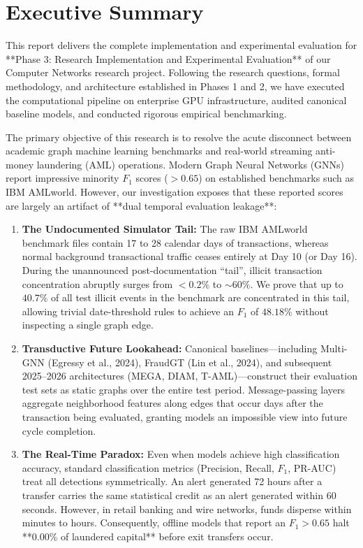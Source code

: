 \documentclass[11pt,a4paper]{article}
\begin{document}
\newpage
\tableofcontents
\newpage
\listoffigures
\listoftables
\newpage

\section{Executive Summary}
\label{sec:exec_summary}

This report delivers the complete implementation and experimental evaluation for **Phase 3: Research Implementation and Experimental Evaluation** of our Computer Networks research project. Following the research questions, formal methodology, and architecture established in Phases 1 and 2, we have executed the computational pipeline on enterprise GPU infrastructure, audited canonical baseline models, and conducted rigorous empirical benchmarking.

The primary objective of this research is to resolve the acute disconnect between academic graph machine learning benchmarks and real-world streaming anti-money laundering (AML) operations. Modern Graph Neural Networks (GNNs) report impressive minority $F_1$ scores ($>0.65$) on established benchmarks such as IBM AMLworld. However, our investigation exposes that these reported scores are largely an artifact of **dual temporal evaluation leakage**:
\begin{enumerate}[leftmargin=*]
    \item \textbf{The Undocumented Simulator Tail:} The raw IBM AMLworld benchmark files contain 17 to 28 calendar days of transactions, whereas normal background transactional traffic ceases entirely at Day 10 (or Day 16). During the unannounced post-documentation ``tail'', illicit transaction concentration abruptly surges from $<0.2\%$ to $\sim60\%$. We prove that up to $40.7\%$ of all test illicit events in the benchmark are concentrated in this tail, allowing trivial date-threshold rules to achieve an $F_1$ of $48.18\%$ without inspecting a single graph edge.
    \item \textbf{Transductive Future Lookahead:} Canonical baselines—including Multi-GNN (Egressy et al., 2024), FraudGT (Lin et al., 2024), and subsequent 2025--2026 architectures (MEGA, DIAM, T-AML)—construct their evaluation test sets as static graphs over the entire test period. Message-passing layers aggregate neighborhood features along edges that occur days after the transaction being evaluated, granting models an impossible view into future cycle completion.
    \item \textbf{The Real-Time Paradox:} Even when models achieve high classification accuracy, standard classification metrics (Precision, Recall, $F_1$, PR-AUC) treat all detections symmetrically. An alert generated 72 hours after a transfer carries the same statistical credit as an alert generated within 60 seconds. However, in retail banking and wire networks, funds disperse within minutes to hours. Consequently, offline models that report an $F_1 > 0.65$ halt **$0.00\%$ of laundered capital** before exit transfers occur.
\end{enumerate}
\end{document}
